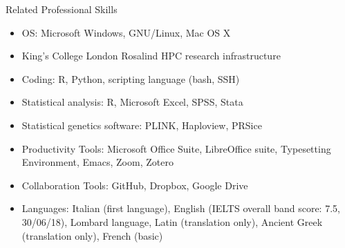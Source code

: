 \documentclass{resume2} %
\begin{document}





\begin{rSection}{Related Professional Skills}
\begin{multicols}{2}[]
  \begin{itemize}
    \item OS: Microsoft Windows, GNU\slash Linux, Mac OS X
    \item King's College London Rosalind HPC research infrastructure
    \item Coding: R, Python, scripting language (bash, SSH)
    \item Statistical analysis: R, Microsoft Excel, SPSS, Stata
    \item Statistical genetics software: PLINK, Haploview, PRSice
	\item Productivity Tools: Microsoft Office Suite, LibreOffice suite, \LaTeXe \hspace{.1mm} Typesetting Environment, Emacs, Zoom, Zotero
    \item Collaboration Tools: GitHub, Dropbox, Google Drive
    \item Languages: Italian (first language), English (IELTS overall band score: 7.5, 30/06/18), Lombard language, Latin (translation only), Ancient Greek (translation only), French (basic)
\end{itemize}
\end{multicols}
\end{rSection}

\end{document}
